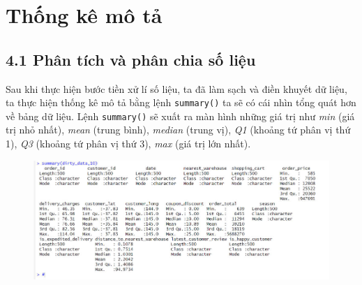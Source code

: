 \section{Thống kê mô tả}
\subsection*{4.1 Phân tích và phân chia số liệu}
Sau khi thực hiện bước tiền xử lí số liệu, ta đã làm sạch và điền khuyết dữ liệu, ta thực hiện thống kê mô tả bằng lệnh \texttt{summary()} ta sẽ có cái nhìn tổng quát hơn về bảng dữ liệu. Lệnh \texttt{summary()} sẽ xuất ra màn hình những giá trị như \textit{min} (giá trị nhỏ nhất), \textit{mean} (trung bình), \textit{median} (trung vị), \textit{Q1} (khoảng tứ phân vị thứ 1), \textit{Q3} (khoảng tứ phân vị thứ 3), \textit{max} (giá trị lớn nhất).
\begin{figure}[H]
    \centering
    \includegraphics[width=0.9\linewidth]{graphics/bang1.jpg}
\end{figure}
